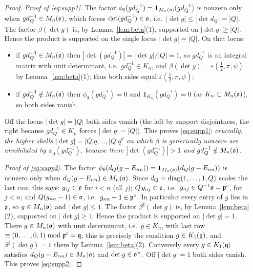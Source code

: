 \begin{proof}
\emph{Proof of \eqref{eq:supp1}.} The factor $\phi_0(g d_Q^{-1})=\mathbf 1_{M_n(\mathfrak{o})}(g d_Q^{-1})$
is nonzero only when $g d_Q^{-1}\in M_n(\mathfrak{o})$, which forces $\det(g d_Q^{-1})\in\mathfrak{o}$,
i.e.\ $|\det g|\le|\det d_Q|=|Q|$. The factor $\beta(\det g)$ is, by
Lemma~\ref{lem:beta}(1), supported on $|\det g|\ge|Q|$. Hence the product is supported on the
single locus $|\det g|=|Q|$. On that locus:
\begin{itemize}\setlength\itemsep{1pt}
\item if $g d_Q^{-1}\in M_n(\mathfrak{o})$ then $|\det(g d_Q^{-1})|=|\det g|/|Q|=1$, so
$g d_Q^{-1}$ is an integral matrix with unit determinant, i.e.\ $g d_Q^{-1}\in K_n$, and
$\beta(\det g)=\varepsilon(\tfrac12,\pi,\psi)$ by Lemma~\ref{lem:beta}(1); thus both sides
equal $\varepsilon(\tfrac12,\pi,\psi)$;
\item if $g d_Q^{-1}\notin M_n(\mathfrak{o})$ then $\phi_0(g d_Q^{-1})=0$ and
$\mathbf 1_{K_n}(g d_Q^{-1})=0$ (as $K_n\subset M_n(\mathfrak{o})$), so both sides vanish.
\end{itemize}
Off the locus $|\det g|=|Q|$ both sides vanish (the left by support disjointness, the right
because $g d_Q^{-1}\in K_n$ forces $|\det g|=|Q|$). This proves \eqref{eq:supp1}; \emph{crucially,
the higher shells $|\det g|=|Q|q,\dots,|Q|q^{d}$ on which $\beta$ is generically nonzero are
annihilated by $\phi_0(g d_Q^{-1})$, because there $|\det(g d_Q^{-1})|>1$ and $g d_Q^{-1}\notin
M_n(\mathfrak{o})$.}

\emph{Proof of \eqref{eq:supp2}.} The factor $\phi_0(d_Q(g-E_{nn}))=\mathbf 1_{M_n(\mathfrak{o})}(d_Q(g-E_{nn}))$
is nonzero only when $d_Q(g-E_{nn})\in M_n(\mathfrak{o})$. Since $d_Q=\operatorname{diag}(1,\dots,1,Q)$ scales
the last \emph{row}, this says: $g_{ij}\in\mathfrak{o}$ for $i<n$ (all $j$); $Q\,g_{nj}\in\mathfrak{o}$,
i.e.\ $g_{nj}\in Q^{-1}\mathfrak{o}=\mathfrak{p}^{c}$, for $j<n$; and $Q(g_{nn}-1)\in\mathfrak{o}$, i.e.\
$g_{nn}-1\in\mathfrak{p}^{c}$. In particular every entry of $g$ lies in $\mathfrak{o}$, so $g\in M_n(\mathfrak{o})$
and $|\det g|\le1$. The factor $\beta^\sharp(\det g)$ is, by Lemma~\ref{lem:beta}(2), supported on
$|\det g|\ge1$. Hence the product is supported on $|\det g|=1$. There $g\in M_n(\mathfrak{o})$ with
unit determinant, i.e.\ $g\in K_n$, with last row $\equiv(0,\dots,0,1)\bmod\mathfrak{p}^{c}=\mathfrak{q}$; this
is precisely the condition $g\in K_1(\mathfrak{q})$, and $\beta^\sharp(\det g)=1$ there by
Lemma~\ref{lem:beta}(2). Conversely every $g\in K_1(\mathfrak{q})$ satisfies $d_Q(g-E_{nn})\in M_n(\mathfrak{o})$
and $\det g\in\mathfrak{o}^\times$. Off $|\det g|=1$ both sides vanish. This proves \eqref{eq:supp2}.
\end{proof}

